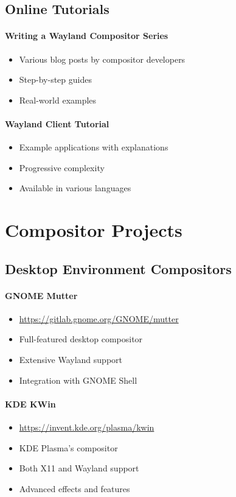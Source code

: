 \subsection{Online Tutorials}

\paragraph{Writing a Wayland Compositor Series}
\begin{itemize}
    \item Various blog posts by compositor developers
    \item Step-by-step guides
    \item Real-world examples
\end{itemize}

\paragraph{Wayland Client Tutorial}
\begin{itemize}
    \item Example applications with explanations
    \item Progressive complexity
    \item Available in various languages
\end{itemize}

\section{Compositor Projects}

\subsection{Desktop Environment Compositors}

\paragraph{GNOME Mutter}
\begin{itemize}
    \item \url{https://gitlab.gnome.org/GNOME/mutter}
    \item Full-featured desktop compositor
    \item Extensive Wayland support
    \item Integration with GNOME Shell
\end{itemize}

\paragraph{KDE KWin}
\begin{itemize}
    \item \url{https://invent.kde.org/plasma/kwin}
    \item KDE Plasma's compositor
    \item Both X11 and Wayland support
    \item Advanced effects and features
\end{itemize}

